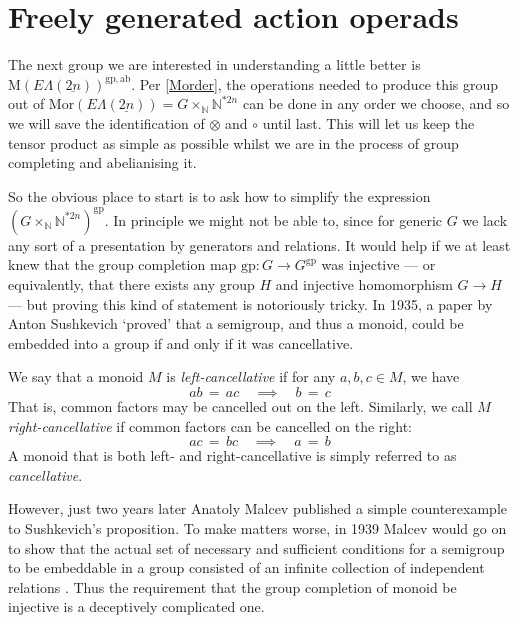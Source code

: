 \documentclass{amsbook} %
\newcommand{\ELnn}{E\Lambda(\underline{2n})}
\numberwithin{section}{chapter}
\begin{document}
\section{Freely generated action operads}

The next group we are interested in understanding a little better is $\mathrm{M}(\ELnn)^{\mathrm{gp},\mathrm{ab}}$. Per \cref{Morder}, the operations needed to produce this group out of $\mathrm{Mor}(\ELnn) = G \times_{\mathbb{N}} \mathbb{N}^{\ast 2n}$ can be done in any order we choose, and so we will save the identification of $\otimes$ and $\circ$ until last. This will let us keep the tensor product as simple as possible whilst we are in the process of group completing and abelianising it.

So the obvious place to start is to ask how to simplify the expression $(G \times_{\mathbb{N}} \mathbb{N}^{\ast 2n})^{\mathrm{gp}}$. In principle we might not be able to, since for generic $G$ we lack any sort of a presentation by generators and relations. It would help if we at least knew that the group completion map $\mathrm{gp} : G \to G^{\mathrm{gp}}$ was injective --- or equivalently, that there exists any group $H$ and injective homomorphism $G \to H$ --- but proving this kind of statement is notoriously tricky. In 1935, a paper by Anton Sushkevich `proved' that a semigroup, and thus a monoid, could be embedded into a group if and only if it was cancellative.

\begin{Defi} We say that a monoid $M$ is \emph{left-cancellative} if for any $a, b, c \in M$, we have
\[ ab \, = \, ac \quad \implies \quad b \, = \, c \]
That is, common factors may be cancelled out on the left. Similarly, we call $M$ \emph{right-cancellative} if common factors can be cancelled on the right:
\[ ac \, = \, bc \quad \implies \quad a \, = \, b \]
A monoid that is both left- and right-cancellative is simply referred to as \emph{cancellative}.
\end{Defi}

However, just two years later Anatoly Malcev published a simple counterexample \cite{malcev-immer1} to Sushkevich's proposition. To make matters worse, in 1939 Malcev would go on to show that the actual set of necessary and sufficient conditions for a semigroup to be embeddable in a group consisted of an infinite collection of independent relations \cite{malcev-immer2}. Thus the requirement that the group completion of monoid be injective is a deceptively complicated one. 
\end{document}

